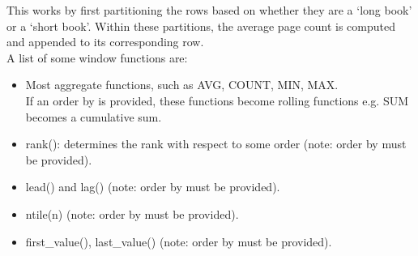 \documentclass[8pt]{extarticle}
\begin{document}
\begin{multicols}{4}
This works by first partitioning the rows based on whether they are a `long book' or a `short book'. Within these partitions, the average page count is computed and appended to its corresponding row.\\

A list of some window functions are:

\begin{itemize}[leftmargin=*]
    \item Most aggregate functions, such as AVG, COUNT, MIN, MAX. \\If an order by is provided, these functions become rolling functions e.g. SUM becomes a cumulative sum.
    \item rank(): determines the rank with respect to some order (note: order by must be provided).
    \item lead() and lag() (note: order by must be provided).
    \item ntile(n) (note: order by must be provided).
    \item first\_value(), last\_value() (note: order by must be provided).
\end{itemize}

\end{multicols}
\end{document}
